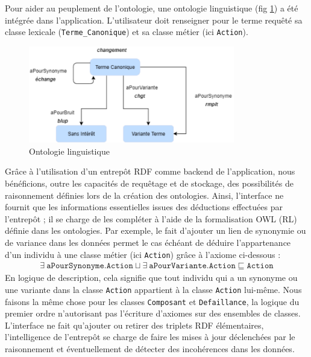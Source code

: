 %
Pour aider au peuplement de l'ontologie, une ontologie linguistique (fig \ref{fig:ling}) a été intégrée dans l'application. L'utilisateur doit renseigner pour le terme requêté sa classe lexicale (\texttt{Terme\_Canonique}) et sa classe métier (ici \texttt{Action}).
%
\begin{figure}[tb]
    \begin{center}
        \includegraphics[width=9cm]{figures/ontLing}
    \end{center}
    \caption{Ontologie linguistique}\label{fig:ling}
\end{figure}
%
Grâce à l'utilisation d'un entrepôt RDF comme backend de l'application, nous bénéficions, outre les capacités de requêtage et de stockage, des possibilités de raisonnement définies lors de la création des ontologies. Ainsi, l'interface ne fournit que les informations essentielles issues des déductions effectuées par l'entrepôt ; il se charge de les compléter à l'aide de la formalisation OWL (RL)\cite{owlprofiles} définie dans les ontologies. Par exemple, le fait d'ajouter un lien de synonymie ou de variance dans les données permet le cas échéant de déduire l'appartenance d'un individu à une classe métier (ici \texttt{Action}) grâce à l'axiome ci-dessous :
$$
\begin{array}{ll}
\exists  \ \texttt{aPourSynonyme} .  \texttt {Action}  \sqcup \exists  \ \texttt{aPourVariante} .  \texttt {Action}
\sqsubseteq    \texttt{Action}
\end{array}
$$
En logique de description, cela signifie que tout individu qui a un synonyme ou une variante dans la classe \texttt{Action} appartient à la classe \texttt{Action} lui-même. Nous faisons la même chose pour les classes \texttt{Composant} et \texttt{Defaillance}, la logique du premier ordre n'autorisant pas l'écriture d'axiomes sur des ensembles de classes.
L'interface ne fait qu'ajouter ou retirer des triplets RDF élémentaires, l'intelligence de l'entrepôt se charge de faire les mises à jour déclenchées par le raisonnement et éventuellement de détecter des incohérences dans les données.
